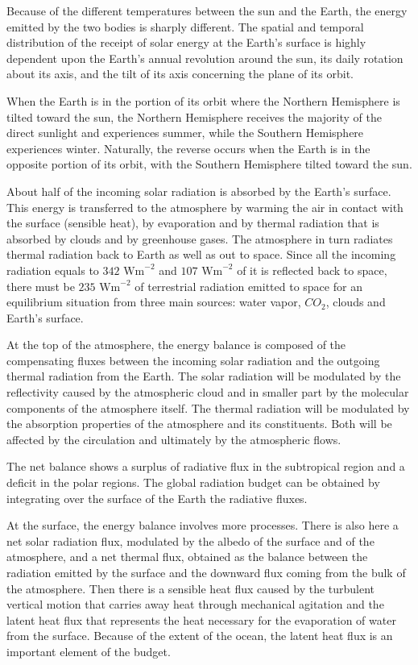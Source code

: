 Because of the different temperatures between the sun and the Earth, the energy emitted by the two bodies is sharply different. The spatial and temporal distribution of the receipt of solar energy at the Earth’s surface is highly dependent upon the Earth's annual revolution around the sun, its daily rotation about its axis, and the tilt of its axis concerning the plane of its orbit.

When the Earth is in the portion of its orbit where the Northern Hemisphere is tilted toward the sun, the Northern Hemisphere receives the majority of the direct sunlight and experiences summer, while the Southern Hemisphere experiences winter. Naturally, the reverse occurs when the Earth is in the opposite portion of its orbit, with the Southern Hemisphere tilted toward the sun.

About half of the incoming solar radiation is absorbed by the Earth's surface. This energy is transferred to the atmosphere by warming the air in contact with the surface (sensible heat), by evaporation and by thermal radiation that is absorbed by clouds and by greenhouse gases. The atmosphere in turn radiates thermal radiation back to Earth as well as out to space. Since all the
incoming radiation equals to $342 \,\, \text{Wm}^{-2}$ and $107 \,\, \text{Wm}^{-2}$ of it is reflected back to space, there must be
$235\,\, \text{Wm}^{-2}$ of terrestrial radiation emitted to space for an equilibrium situation from three main sources: water vapor, $CO_2$, clouds and Earth’s surface.

At the top of the atmosphere, the energy balance is composed of the compensating fluxes between the incoming solar radiation and the outgoing thermal radiation from the Earth. The solar radiation will be modulated by the reflectivity caused by the atmospheric cloud and in smaller part by the molecular components of the atmosphere itself. The thermal radiation will be modulated by the absorption properties of the atmosphere and its constituents. Both will be affected by the circulation and ultimately by the atmospheric flows.

The net balance shows a surplus of radiative flux in the subtropical region and a deficit in the polar regions. The global radiation budget can be obtained by integrating over the surface of the Earth the radiative fluxes.

At the surface, the energy balance involves more processes. There is also here a net solar radiation flux, modulated by the albedo of the surface and of the atmosphere, and a net thermal flux, obtained as the balance between the radiation emitted by the surface and the downward flux coming from the bulk of the atmosphere. Then there is a sensible heat flux caused by the turbulent vertical motion that carries away heat through mechanical agitation and the latent heat flux that represents the heat necessary for the evaporation of water from the surface. Because of the extent of the ocean, the latent heat flux is an important element of the budget.

